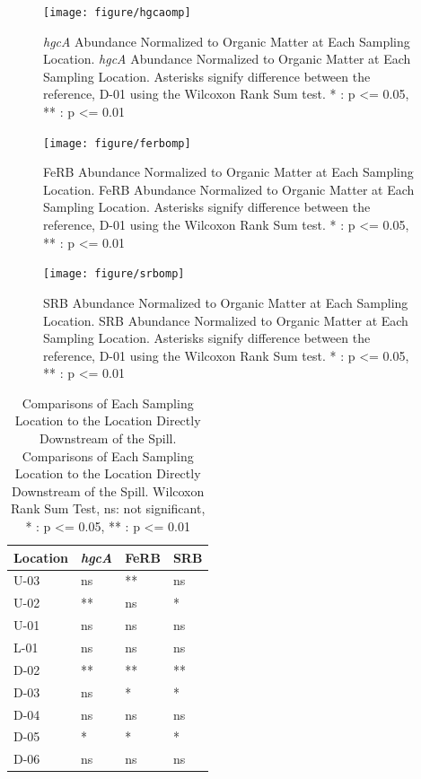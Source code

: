 \documentclass[ms, hidelinks]{uncgdissertationexp3}
\theoremstyle{plain}
\theoremstyle{definition}
\theoremstyle{remark}
\newcommand{\titlecaption}[2]{\caption[#1]{#1. #2}}
\begin{document}
\begin{figure}[htbp]
    \texttt{[image: figure/hgcaomp]}
    \titlecaption{\textit{hgcA} Abundance Normalized to Organic Matter at Each Sampling Location}{\textit{hgcA} Abundance Normalized to Organic Matter at Each Sampling Location. Asterisks signify difference between the reference, D-01 using the Wilcoxon Rank Sum test. * : p <= 0.05, ** : p <= 0.01}\label{fig:hgcaomp}
\end{figure}
\clearpage
\begin{figure}
  \texttt{[image: figure/ferbomp]}
   \titlecaption{FeRB Abundance Normalized to Organic Matter at Each Sampling Location}{FeRB Abundance Normalized to Organic Matter at Each Sampling Location. Asterisks signify difference between the reference, D-01 using the Wilcoxon Rank Sum test. * : p <= 0.05, ** : p <= 0.01}\label{fig:ferbomp}
\end{figure}
\clearpage
\begin{figure}
  \texttt{[image: figure/srbomp]}
   \titlecaption{SRB Abundance Normalized to Organic Matter at Each Sampling Location}{SRB Abundance Normalized to Organic Matter at Each Sampling Location. Asterisks signify difference between the reference, D-01 using the Wilcoxon Rank Sum test. * : p <= 0.05, ** : p <= 0.01}\label{fig:srbomp}
\end{figure}
\clearpage
\begin{table}[htbp]
  \centering
  \titlecaption{Comparisons of Each Sampling Location to the Location Directly Downstream of the Spill}{Comparisons of Each Sampling Location to the Location Directly Downstream of the Spill. Wilcoxon Rank Sum Test, ns: not significant, * : p <= 0.05, ** : p <= 0.01}\label{tab:compare}
    \begin{tabular}{llll}
  \toprule
  Location & \textit{hgcA} & FeRB & SRB\\
  \midrule
  U-03 & ns & ** & ns\\
  U-02 & ** & ns & *\\
  U-01 & ns & ns & ns\\
  L-01 & ns & ns & ns\\
  D-02 & ** & ** & **\\
  D-03 & ns & * & *\\
  D-04 & ns & ns & ns\\
  D-05 & * & * & *\\
  D-06 & ns & ns & ns\\
  \bottomrule
  \end{tabular}
\end{table}
\end{document}
